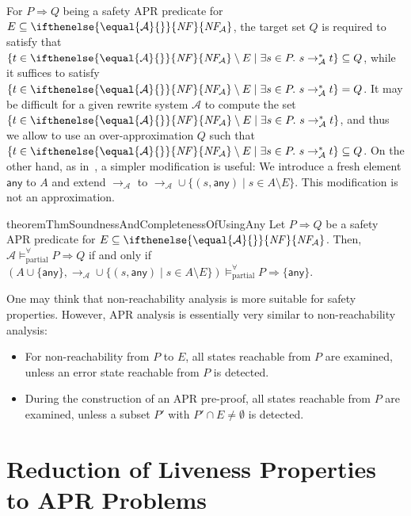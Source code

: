 \documentclass[10pt,a4paper]{article}
\def\cA{\mathcal{A}}
\newcommand{\symb}[1]{\mathsf{#1}}
\newcommand{\NF}[1][]{\ifthenelse{\equal{#1}{}}{\mathit{NF}}{\mathit{NF\!}_{#1}}}
\newcommand{\ReachPred}[2]{#1 \Rightarrow #2}
\newcommand{\Valid}[3]{#2 \mathrel{\mathrel{\models^\forall_{\mathrm{#1}}}} #3}
\newcommand{\PartiallyValid}[2][\cA]{\Valid{partial}{#1}{#2}}
\begin{document}
For $\ReachPred{P}{Q}$ being a safety APR predicate for $E \subseteq \NF[\cA]$,
the target set $Q$ is required to satisfy that
$\{ t \in \NF[\cA] \setminus E \mid \exists s \in P.\ s \to_\cA^* t \} \subseteq Q$,
while it suffices to satisfy $\{ t \in \NF[\cA] \setminus E \mid \exists s \in P.\ s \to_\cA^* t \} = Q$.
It may be difficult for a given rewrite system $\cA$ to compute the set $\{ t \in \NF[\cA] \setminus E \mid \exists s \in P.\ s \to_\cA^* t \}$, and thus we allow to use an over-approximation $Q$ such that $\{ t \in \NF[\cA] \setminus E \mid \exists s \in P.\ s \to_\cA^* t \} \subseteq Q$.
On the other hand, as in~\cite{KN23jlamp}, a simpler modification is useful:
We introduce a fresh element $\symb{any}$ to $A$ and extend $\to_\cA$ to ${\to_\cA} \cup \{ (s,\symb{any}) \mid s \in A \setminus E \}$.
This modification is not an approximation.

\begin{restatable}{theorem}{ThmSoundnessAndCompletenessOfUsingAny}
	\label{thm:soundness-and-completeness-of-using-any}
	Let $\ReachPred{P}{Q}$ be a safety APR predicate for $E \subseteq \NF[\cA]$.
	Then,
	$\PartiallyValid[\cA]{\ReachPred{P}{Q}}$ if and only if
	$\PartiallyValid[(A\cup\{\symb{any}\}, {\to_\cA}\cup\{ (s,\symb{any}) \mid s \in A \setminus E \})]{\ReachPred{P}{\{\symb{any}\}}}$.
\end{restatable}



One may think that non-reachability analysis is more suitable for safety properties.
However, APR analysis is essentially very similar to non-reachability analysis:
\begin{itemize}
	\item For non-reachability from $P$ to $E$, all states reachable from $P$ are examined, unless an error state reachable from $P$ is detected.
	\item During the construction of an APR pre-proof, all states reachable from $P$ are examined, unless a subset $P'$ with $P'\cap E \ne \emptyset$ is detected.
\end{itemize}


\section{Reduction of Liveness Properties to APR Problems}
\label{sec:reduction-of-liveness}
\end{document}

